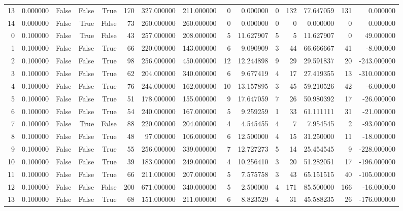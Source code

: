 \begin{table}[htbp]
\begin{tabular}{rrrrrrrrrrrrrrr}
13 & 0.000000 & False & False & True & 170 & 327.000000 & 211.000000 & 0 & 0.000000 & 0 & 132 & 77.647059 & 131 & 0.000000 \\
14 & 0.000000 & False & True & False & 73 & 260.000000 & 260.000000 & 0 & 0.000000 & 0 & 0 & 0.000000 & 0 & 0.000000 \\
0 & 0.100000 & False & True & False & 43 & 257.000000 & 208.000000 & 5 & 11.627907 & 5 & 5 & 11.627907 & 0 & 49.000000 \\
1 & 0.100000 & False & False & True & 66 & 220.000000 & 143.000000 & 6 & 9.090909 & 3 & 44 & 66.666667 & 41 & -8.000000 \\
2 & 0.100000 & False & False & True & 98 & 256.000000 & 450.000000 & 12 & 12.244898 & 9 & 29 & 29.591837 & 20 & -243.000000 \\
3 & 0.100000 & False & False & True & 62 & 204.000000 & 340.000000 & 6 & 9.677419 & 4 & 17 & 27.419355 & 13 & -310.000000 \\
4 & 0.100000 & False & False & True & 76 & 244.000000 & 162.000000 & 10 & 13.157895 & 3 & 45 & 59.210526 & 42 & -6.000000 \\
5 & 0.100000 & False & False & True & 51 & 178.000000 & 155.000000 & 9 & 17.647059 & 7 & 26 & 50.980392 & 17 & -26.000000 \\
6 & 0.100000 & False & False & True & 54 & 240.000000 & 167.000000 & 5 & 9.259259 & 1 & 33 & 61.111111 & 31 & -21.000000 \\
7 & 0.100000 & False & True & False & 88 & 220.000000 & 204.000000 & 4 & 4.545455 & 4 & 7 & 7.954545 & 2 & -93.000000 \\
8 & 0.100000 & False & False & True & 48 & 97.000000 & 106.000000 & 6 & 12.500000 & 4 & 15 & 31.250000 & 11 & -18.000000 \\
9 & 0.100000 & False & False & True & 55 & 256.000000 & 339.000000 & 7 & 12.727273 & 5 & 14 & 25.454545 & 9 & -228.000000 \\
10 & 0.100000 & False & False & True & 39 & 183.000000 & 249.000000 & 4 & 10.256410 & 3 & 20 & 51.282051 & 17 & -196.000000 \\
11 & 0.100000 & False & False & True & 66 & 211.000000 & 207.000000 & 5 & 7.575758 & 3 & 43 & 65.151515 & 40 & -105.000000 \\
12 & 0.100000 & False & False & False & 200 & 671.000000 & 340.000000 & 5 & 2.500000 & 4 & 171 & 85.500000 & 166 & -16.000000 \\
13 & 0.100000 & False & False & True & 68 & 151.000000 & 211.000000 & 6 & 8.823529 & 4 & 31 & 45.588235 & 26 & -176.000000 \\

\end{tabular}
\end{table}
